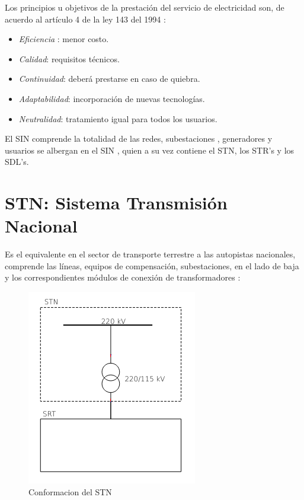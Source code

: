 \documentclass[a5paper]{book}%
\begin{document}
Los principios u objetivos de la prestación del servicio de electricidad son, de acuerdo al artículo 4 de  la ley  143 del 1994 \cite{LEY143}:

\begin{itemize}
\item\textit{ Eficiencia }: menor costo.
\item \textit{Calidad}: requisitos técnicos.
\item \textit{Continuidad}: deberá prestarse en caso de quiebra.
\item \textit{Adaptabilidad}: incorporación de nuevas tecnologías.
\item \textit{Neutralidad}: tratamiento igual para todos los usuarios.
\end{itemize}

El \ac{SIN} comprende la totalidad de las redes, subestaciones , generadores y usuarios se albergan en el \ac{SIN} , quien a su vez contiene el \ac{STN}, los  \ac{STR}'s y  los \ac{SDL}'s.

\section{STN: Sistema Transmisión Nacional}
Es el equivalente en el sector de transporte terrestre  a las autopistas nacionales, comprende las líneas, equipos de compensación, subestaciones, en el lado de baja y los correspondientes módulos de conexión de transformadores \cite{XM-2018-1}:
\begin{center}
\end{center}

\begin{figure}[H]
  \centering
  \caption{Conformacion del STN}
  \includegraphics[width=0.5\linewidth]{STN_F}
\end{figure}
\end{document}
